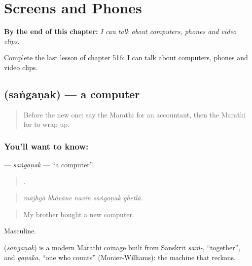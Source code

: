 
\chapter{Screens and Phones}
\label{ch:mr-screens-and-phones}

\begin{chapteropening}
\textbf{By the end of this chapter:} \emph{I can talk about computers, phones and video clips.}

Complete the last lesson of chapter 516: I can talk about computers, phones and video clips.
\end{chapteropening}

\section[\texorpdfstring{\mr{संगणक} (saṅgaṇak)}{संगणक (saṅgaṇak)}]{ (saṅgaṇak) — a computer}

\label{lesson:MR-C516-sanganak}



\begin{quote}
Before the new one: say the Marathi for an accountant, then the Marathi for to wrap up.
\end{quote}

\subsection*{You'll want to know: }
\textbf{} — \emph{saṅgaṇak} — \textquotedblleft{}a computer\textquotedblright{}.

\begin{quote}
    .
\end{quote}

\begin{quote}
\emph{mājhyā bhāvāne navīn saṅgaṇak ghetlā.}
\end{quote}

\begin{quote}
My brother bought a new computer.
\end{quote}

Masculine.

\begin{cousinweb}
\textbf{} (\emph{saṅgaṇak}) is a modern Marathi coinage built from Sanskrit \emph{saṁ-}, \textquotedblleft{}together\textquotedblright{}, and \emph{gaṇaka}, \textquotedblleft{}one who counts\textquotedblright{} (Monier-Williams): the machine that reckons.
\end{cousinweb}


